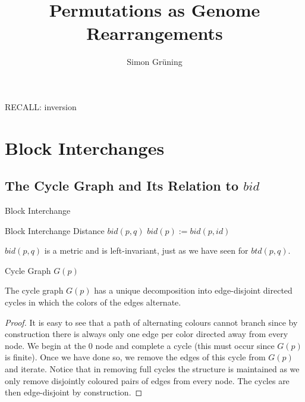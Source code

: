 


\title{Permutations as Genome Rearrangements}
\author{Simon Gr\"uning}
\address[Simon Gr\"uning]{University of Zurich, R\"{a}mistrasse 71, 8006 Zurich}

\maketitle

\clearpage



\begin{remark}
RECALL: inversion
\end{remark}


\section{Block Interchanges}

\subsection{The Cycle Graph and Its Relation to $bid$}

\begin{definition}
Block Interchange
\end{definition}

\begin{definition}
Block Interchange Distance
$bid(p,q)$
$bid(p) := bid(p,id)$
\end{definition}

\begin{remark}
$bid(p,q)$ is a metric and is left-invariant, just as we have seen for $btd(p,q)$.
\end{remark}

\begin{definition}
Cycle Graph $G(p)$
\end{definition}

\begin{lemma}
The cycle graph $G(p)$ has a unique decomposition into edge-disjoint directed cycles in which the colors of the edges alternate.
\end{lemma}

\begin{proof}
It is easy to see that a path of alternating colours cannot branch since by construction there is always only one edge per color directed away from every node. We begin at the $0$ node and complete a cycle (this must occur since $G(p)$ is finite). Once we have done so, we remove the edges of this cycle from $G(p)$ and iterate. Notice that in removing full cycles the structure is maintained as we only remove disjointly coloured pairs of edges from every node. The cycles are then edge-disjoint by construction.
\end{proof}

